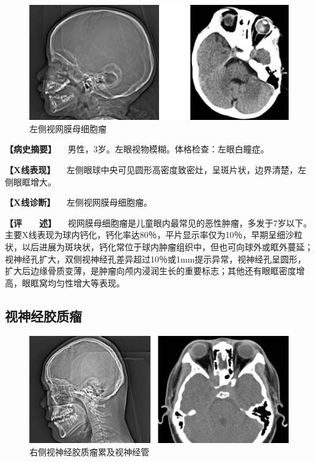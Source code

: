 \begin{figure}[!htbp]
 \centering
 \includegraphics{./images/Image00417.jpg}
 \captionsetup{justification=centering}
 \caption{左侧视网膜母细胞瘤}
 \label{fig7-2-1}
  \end{figure} 

\textbf{【病史摘要】} 　男性，3岁。左眼视物模糊。体格检查：左眼白瞳症。

\textbf{【X线表现】}
　左侧眼球中央可见圆形高密度致密灶，呈斑片状，边界清楚，左侧眼眶增大。

\textbf{【X线诊断】} 　左侧视网膜母细胞瘤。

\textbf{【评　　述】}
　视网膜母细胞瘤是儿童眼内最常见的恶性肿瘤，多发于7岁以下。主要X线表现为球内钙化，钙化率达80％，平片显示率仅为10％，早期呈细沙粒状，以后进展为斑块状，钙化常位于球内肿瘤组织中，但也可向球外或眶外蔓延；视神经孔扩大，双侧视神经孔差异超过10％或1mm提示异常，视神经孔呈圆形，扩大后边缘骨质变薄，是肿瘤向颅内浸润生长的重要标志；其他还有眼眶密度增高，眼眶窝均匀性增大等表现。

\subsection{视神经胶质瘤}

\begin{figure}[!htbp]
 \centering
 \includegraphics{./images/Image00418.jpg}
 \captionsetup{justification=centering}
 \caption{右侧视神经胶质瘤累及视神经管}
 \label{fig7-2-2}
  \end{figure} 

